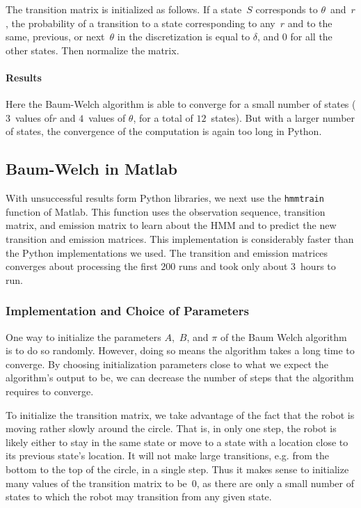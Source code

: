 \documentclass[twoside]{article}
\begin{document}
The transition matrix is initialized as follows.
If a state~$S$ corresponds to $\theta$~and~$r$, the probability of a transition to a state corresponding to any~$r$ and to the same, previous, or next~$\theta$ in the discretization is equal to $\delta$, and $0$ for all the other states.
Then normalize the matrix.

\paragraph{Results}

Here the Baum-Welch algorithm is able to converge for a small number of states ($3$~values of$r$ and $4$~values of $\theta$, for a total of $12$~states).
But with a larger number of states, the convergence of the computation is again too long in Python.

\subsection{Baum-Welch in Matlab}\label{sec:baum-welch-matlab}

With unsuccessful results form Python libraries, we next use the \texttt{\small hmmtrain} function of Matlab.
This function uses the observation sequence, transition matrix, and emission matrix to learn about the HMM and to predict the new transition and emission matrices.
This implementation is considerably faster than the Python implementations we used.
The transition and emission matrices converges about processing the first $\num{200}$ runs and took only about $\num{3}$~hours to run.

\subsubsection{Implementation and Choice of Parameters}\label{sec:choice-parameters}


One way to initialize the parameters $A$,~$B$, and $\pi$ of the Baum Welch algorithm is to do so randomly.
However, doing so means the algorithm takes a long time to converge.
By choosing initialization parameters close to what we expect the algorithm's output to be, we can decrease the number of steps that the algorithm requires to converge.

To initialize the transition matrix, we take advantage of the fact that the robot is moving rather slowly around the circle.
That is, in only one step, the robot is likely either to stay in the same state or move to a state with a location close to its previous state's location.
It will not make large transitions, e.g. from the bottom to the top of the circle, in a single step.
Thus it makes sense to initialize many values of the transition matrix to be~$0$, as there are only a small number of states to which the robot may transition from any given state.
\end{document}
